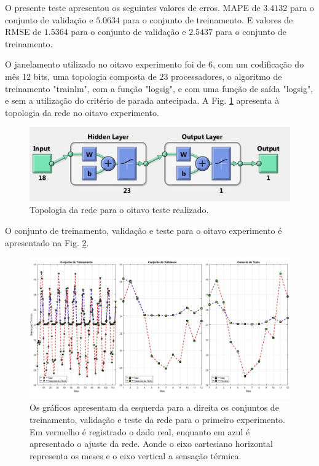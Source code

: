 \documentclass[journal, a4paper]{IEEEtran}
\begin{document}
O presente teste apresentou os seguintes valores de erros. MAPE de $3.4132$ para o conjunto de validação e $5.0634$ para o conjunto de treinamento. E valores de RMSE de $1.5364$ para o conjunto de validação e $2.5437$ para o conjunto de treinamento.

O janelamento utilizado no oitavo experimento foi de 6, com um codificação do mês 12 bits, uma topologia composta de $23$ processadores, o algoritmo de treinamento "trainlm", com a função "logsig", e com uma função de saída "logsig", e sem a utilização do critério de parada antecipada. A Fig. \ref{topo8} apresenta à topologia da rede no oitavo experimento. 

\begin{figure}[H]
	\centering
	\includegraphics[scale=0.5]{Images/topologia8.jpg}
	\caption{Topologia da rede para o oitavo teste realizado.}
	\label{topo8}
\end{figure} 


O conjunto de treinamento, validação e teste para o oitavo experimento é apresentado na Fig. \ref{teste8}.

\begin{figure}[H]
	\centering
	\includegraphics[scale=0.15]{Images/Teste8.jpg}
	\caption{Os gráficos apresentam da esquerda para a direita os conjuntos de treinamento, validação e teste da rede para o primeiro experimento. Em vermelho é registrado o dado real, enquanto em azul é apresentado o ajuste da rede. Aonde o eixo cartesiano horizontal representa os meses e o eixo vertical a sensação térmica.}
	\label{teste8}
\end{figure} 
\end{document}

